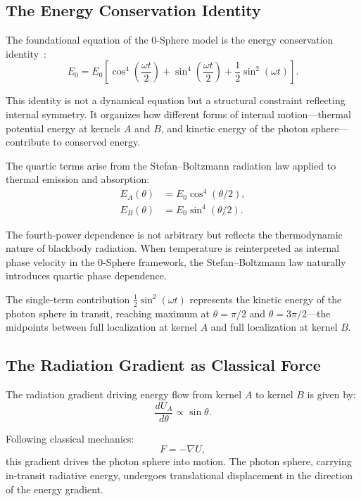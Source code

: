 \documentclass[12pt,letterpaper]{article}
\begin{document}
\subsection{The Energy Conservation Identity}

The foundational equation of the 0-Sphere model is the energy conservation identity~\cite{hanamura17765017}:
\begin{equation}
E_0 = E_0 \left[
\cos^4\!\left(\frac{\omega t}{2}\right)
+ \sin^4\!\left(\frac{\omega t}{2}\right)
+ \frac{1}{2}\sin^2(\omega t)
\right].
\label{eq:energy_identity}
\end{equation}

This identity is not a dynamical equation but a structural constraint reflecting internal symmetry. It organizes how different forms of internal motion—thermal potential energy at kernels $A$ and $B$, and kinetic energy of the photon sphere—contribute to conserved energy.

The quartic terms arise from the Stefan--Boltzmann radiation law applied to thermal emission and absorption:
\begin{align}
E_A(\theta) &= E_0 \cos^4(\theta/2), \\
E_B(\theta) &= E_0 \sin^4(\theta/2).
\end{align}

The fourth-power dependence is not arbitrary but reflects the thermodynamic nature of blackbody radiation. When temperature is reinterpreted as internal phase velocity in the 0-Sphere framework, the Stefan--Boltzmann law naturally introduces quartic phase dependence.

The single-term contribution $\frac{1}{2}\sin^2(\omega t)$ represents the kinetic energy of the photon sphere in transit, reaching maximum at $\theta = \pi/2$ and $\theta = 3\pi/2$—the midpoints between full localization at kernel $A$ and full localization at kernel $B$.

\subsection{The Radiation Gradient as Classical Force}

The radiation gradient driving energy flow from kernel $A$ to kernel $B$ is given by:
\begin{equation}
\frac{dU_A}{d\theta} \propto \sin\theta.
\end{equation}

Following classical mechanics:
\begin{equation}
F = -\nabla U,
\end{equation}
this gradient drives the photon sphere into motion. The photon sphere, carrying in-transit radiative energy, undergoes translational displacement in the direction of the energy gradient.
\end{document}
